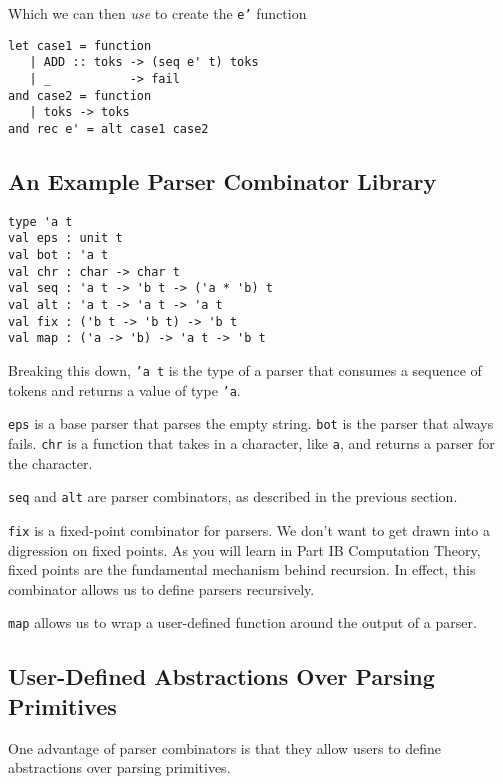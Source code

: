 Which we can then \textit{use} to create the \texttt{e'} function
\begin{verbatim}
let case1 = function
   | ADD :: toks -> (seq e' t) toks
   | _           -> fail
and case2 = function
   | toks -> toks
and rec e' = alt case1 case2
\end{verbatim}

\subsection{An Example Parser Combinator Library}
\begin{verbatim}
type 'a t
val eps : unit t
val bot : 'a t
val chr : char -> char t
val seq : 'a t -> 'b t -> ('a * 'b) t
val alt : 'a t -> 'a t -> 'a t
val fix : ('b t -> 'b t) -> 'b t
val map : ('a -> 'b) -> 'a t -> 'b t
\end{verbatim}

Breaking this down, \texttt{'a t} is the type of a parser that consumes a sequence of tokens and returns a value of type \texttt{'a}. 

\texttt{eps} is a base parser that parses the empty string. \texttt{bot} is the parser that always fails. \texttt{chr} is a function that takes in a character, like \texttt{a}, and returns a parser for the character. 

\texttt{seq} and \texttt{alt} are parser combinators, as described in the previous section.

\texttt{fix} is a fixed-point combinator for parsers. We don't want to get drawn into a digression on fixed points. As you will learn in \textsf{Part IB Computation Theory}, fixed points are the fundamental mechanism behind recursion. In effect, this combinator allows us to define parsers recursively.

\texttt{map} allows us to wrap a user-defined function around the output of a parser.

\subsection{User-Defined Abstractions Over Parsing Primitives}
One advantage of parser combinators is that they allow users to define abstractions over parsing primitives. 

